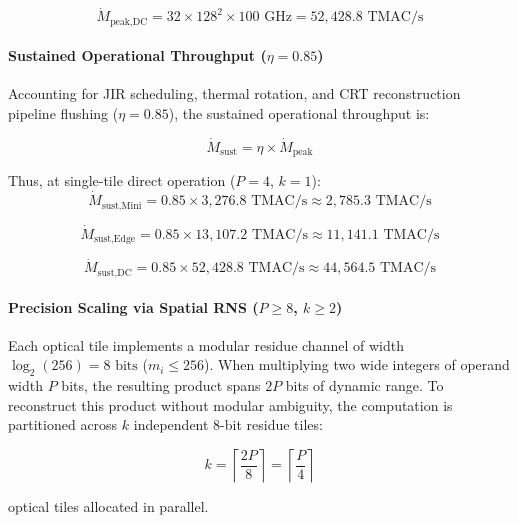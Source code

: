 \documentclass[journal]{IEEEtran}
\begin{document}
\begin{equation}
\dot{M}_{\text{peak,DC}} = 32 \times 128^2 \times 100\text{ GHz} = 52,428.8\text{ TMAC/s}
\end{equation}

\paragraph{\textbf{Sustained Operational Throughput ($\eta = 0.85$)}}
Accounting for JIR scheduling, thermal rotation, and CRT reconstruction pipeline flushing ($\eta = 0.85$), the sustained operational throughput is:

\begin{equation}
\dot{M}_{\text{sust}} = \eta \times \dot{M}_{\text{peak}}
\end{equation}

Thus, at single-tile direct operation ($P=4$, $k=1$):
\begin{equation}
\dot{M}_{\text{sust,Mini}} = 0.85 \times 3,276.8\text{ TMAC/s} \approx 2,785.3\text{ TMAC/s}
\end{equation}

\begin{equation}
\dot{M}_{\text{sust,Edge}} = 0.85 \times 13,107.2\text{ TMAC/s} \approx 11,141.1\text{ TMAC/s}
\end{equation}

\begin{equation}
\dot{M}_{\text{sust,DC}} = 0.85 \times 52,428.8\text{ TMAC/s} \approx 44,564.5\text{ TMAC/s}
\end{equation}

\paragraph{\textbf{Precision Scaling via Spatial RNS ($P \ge 8$, $k \ge 2$)}} 

Each optical tile implements a modular residue channel of width $\log_2(256) = 8\text{ bits}$ ($m_i \le 256$). When multiplying two wide integers of operand width $P$ bits, the resulting product spans $2P$ bits of dynamic range. To reconstruct this product without modular ambiguity, the computation is partitioned across $k$ independent 8-bit residue tiles:

\begin{equation}
k = \left\lceil\frac{2P}{8} \right\rceil = \left\lceil \frac{P}{4} \right\rceil
\end{equation}

optical tiles allocated in parallel.
\end{document}

